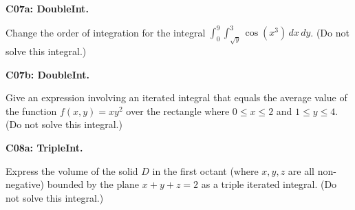 \documentclass[12pt]{article}
\newcommand{\<}{\left\langle}
\renewcommand{\>}{\right\rangle}
\newcommand{\exerciseHeader}[4]{


  \vspace{0.5em}
  \textbf{#2}
  \vspace{0.5em}

}
\begin{document}
\begin{multicols}{2}
%



%

\exerciseHeader{2017 July 05}{C07a: DoubleInt.}{
Compute and apply double integrals.
}{2/4}

Change the order of integration for the integral
\(\int_0^9\int_{\sqrt{y}}^3 \cos(x^3)\,dx\,dy\).
(Do not solve this integral.)

%

\exerciseHeader{2017 July 07}{C07b: DoubleInt.}{
Compute and apply double integrals.
}{4/4}

Give an expression involving an iterated integral that equals
the average value of the function \(f(x,y)=xy^2\) over the
rectangle where \(0\leq x\leq 2\) and
\(1\leq y\leq 4\). (Do not solve this integral.)

%



\exerciseHeader{2017 July 05}{C08a: TripleInt.}{
Compute and apply triple integrals.
}{1/4}

Express the volume of the solid \(D\)
in the first octant (where \(x,y,z\) are all
non-negative) bounded by the plane \(x+y+z=2\) as a triple iterated
integral. (Do not solve this integral.)

%

%


\end{multicols}
\end{document}
